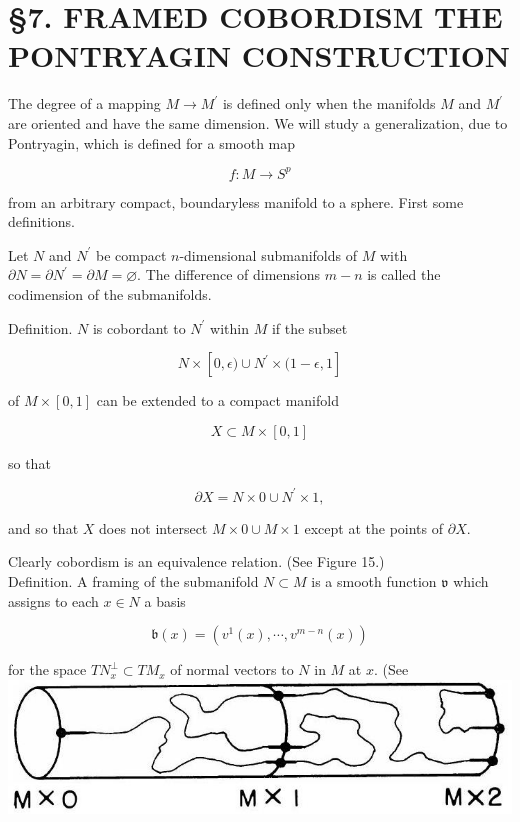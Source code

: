 \documentclass[10pt, letterpaper]{article}
\begin{document}
\section*{§7. FRAMED COBORDISM THE PONTRYAGIN CONSTRUCTION}
The degree of a mapping $M \rightarrow M^{\prime}$ is defined only when the manifolds $M$ and $M^{\prime}$ are oriented and have the same dimension. We will study a generalization, due to Pontryagin, which is defined for a smooth map

$$
f: M \rightarrow S^{p}
$$

from an arbitrary compact, boundaryless manifold to a sphere. First some definitions.

Let $N$ and $N^{\prime}$ be compact $n$-dimensional submanifolds of $M$ with $\partial N=\partial N^{\prime}=\partial M=\varnothing$. The difference of dimensions $m-n$ is called the codimension of the submanifolds.

Definition. $N$ is cobordant to $N^{\prime}$ within $M$ if the subset

$$
N \times[0, \epsilon) \cup N^{\prime} \times(1-\epsilon, 1]
$$

of $M \times[0,1]$ can be extended to a compact manifold

$$
X \subset M \times[0,1]
$$

so that

$$
\partial X=N \times 0 \cup N^{\prime} \times 1,
$$

and so that $X$ does not intersect $M \times 0 \cup M \times 1$ except at the points of $\partial X$.

Clearly cobordism is an equivalence relation. (See Figure 15.)\\
Definition. A framing of the submanifold $N \subset M$ is a smooth function $\mathfrak{v}$ which assigns to each $x \in N$ a basis

$$
\mathfrak{b}(x)=\left(v^{1}(x), \cdots, v^{m-n}(x)\right)
$$

for the space $T N_{x}^{\perp} \subset T M_{x}$ of normal vectors to $N$ in $M$ at $x$. (See\\
\includegraphics[scale=0.2, center]{2025_05_28_7c9927389b272ddbc2c3g-54}
\end{document}
